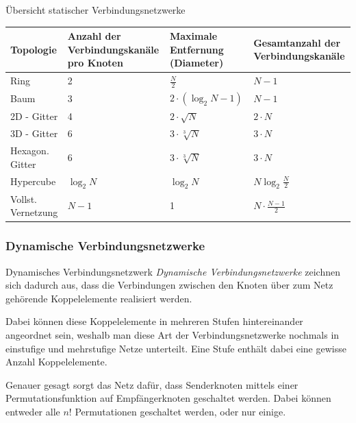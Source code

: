 \begin{bonus}{Übersicht statischer Verbindungsnetzwerke}
    \begin{tabularx}{\textwidth}{@{}lXXX@{}}
        \toprule
        Topologie          & Anzahl der Verbindungskanäle pro Knoten & Maximale Entfernung (Diameter) & Gesamtanzahl der Verbindungskanäle \\
        \midrule
        Ring               & 2                                       & $\frac{N}{2}$                  & $N-1$                              \\
        Baum               & 3                                       & $2\cdot (\log_2 N - 1)$        & $N-1$                              \\
        2D - Gitter        & 4                                       & $2\cdot \sqrt{N}$              & $2\cdot N$                         \\
        3D - Gitter        & 6                                       & $3\cdot \sqrt[3]{N}$           & $3\cdot N$                         \\
        Hexagon. Gitter    & 6                                       & $3\cdot \sqrt[3]{N}$           & $3\cdot N$                         \\
        Hypercube          & $\log_2 N$                              & $\log_2 N$                     & $N \log_2 \frac{N}{2}$             \\
        Vollst. Vernetzung & $N - 1$                                 & 1                              & $N \cdot \frac{N-1}{2}$            \\
    \end{tabularx}
\end{bonus}

\subsubsection{Dynamische Verbindungsnetzwerke}

\begin{defi}{Dynamisches Verbindungsnetzwerk}
    \emph{Dynamische Verbindungsnetzwerke} zeichnen sich dadurch aus, dass die Verbindungen zwischen den Knoten über zum Netz gehörende Koppelelemente realisiert werden.
    
    Dabei können diese Koppelelemente in mehreren Stufen hintereinander angeordnet sein, weshalb man diese Art der Verbindungsnetzwerke nochmals in einstufige und mehrstufige Netze unterteilt.
    Eine Stufe enthält dabei eine gewisse Anzahl Koppelelemente.
    
    Genauer gesagt sorgt das Netz dafür, dass Senderknoten mittels einer Permutationsfunktion auf Empfängerknoten geschaltet werden.
    Dabei können entweder alle $n!$ Permutationen geschaltet werden, oder nur einige.
\end{defi}

